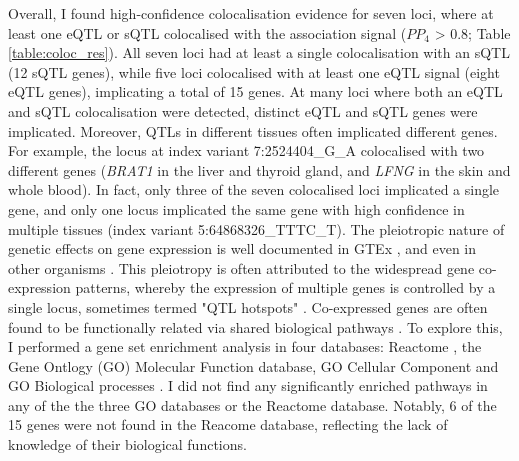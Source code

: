 Overall, I found high-confidence colocalisation evidence for seven loci, where at least one eQTL or sQTL colocalised with the association signal ($PP_{4}$ > 0.8; Table \ref{table:coloc_res}). All seven loci had at least a single colocalisation with an sQTL (12 sQTL genes), while five loci colocalised with at least one eQTL signal (eight eQTL genes), implicating a total of 15 genes. At many loci where both an eQTL and sQTL colocalisation were detected, distinct eQTL and sQTL genes were implicated. Moreover, QTLs in different tissues often implicated different genes. For example, the locus at index variant 7:2524404\_G\_A colocalised with two different genes (\textit{BRAT1} in the liver and thyroid gland, and \textit{LFNG} in the skin and whole blood). In fact, only three of the seven colocalised loci implicated a single gene, and only one locus implicated the same gene with high confidence in multiple tissues (index variant 5:64868326\_TTTC\_T). The pleiotropic nature of genetic effects on gene expression is well documented in GTEx \cite{Ribeiro2021-xj}, and even in other organisms \cite{Brem2002-zj,Schadt2003-ei}. This pleiotropy is often attributed to the widespread gene co-expression patterns, whereby the expression of multiple genes is controlled by a single locus, sometimes termed "QTL hotspots" \cite{Tian2016-hy}. Co-expressed genes are often found to be functionally related via shared biological pathways \cite{Van_Dam2017-vm,Westra2013-mm}. To explore this, I performed a gene set enrichment analysis in four databases: Reactome \cite{Gillespie2022-jr}, the Gene Ontlogy (GO) Molecular Function database, GO Cellular Component and GO Biological processes \cite{Thomas2022-nb}. I did not find any significantly enriched pathways in any of the the three GO databases or the Reactome database. Notably, 6 of the 15 genes were not found in the Reacome database, reflecting the lack of knowledge of their biological functions. 


